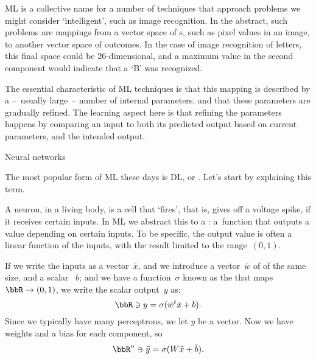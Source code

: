 

\acf{ML} is a collective name for a number of techniques that
approach problems we might consider `intelligent', such as image
recognition. In the abstract, such problems are mappings from a vector
space of s, such as pixel values in an image, to
another vector space of outcomes. In the case of image recognition of
letters, this final space could be 26-dimensional, and a maximum value
in the second component would indicate that a `B' was recognized.

The essential characteristic of \ac{ML} techniques is that
this mapping is described by a --~usually large~-- number of internal
parameters, and that these parameters are gradually refined. The
learning aspect here is that refining the parameters happens by
comparing an input to both its predicted output based on current
parameters, and the intended output.

 {Neural networks}


The most popular form of \ac{ML} these days is \acf{DL}, or
. Let's start by explaining this term.

A neuron, in a living body, is a cell that `fires', that is, gives off
a voltage spike, if it receives certain inputs. In \ac{ML} we abstract
this to a : a~function that outputs a value
depending on certain inputs. To be specific, the output value is often
a linear function of the inputs, with the result
limited to the range~$(0,1)$.

If we write the inputs as a vector~$\bar x$, and we introduce a vector~$\bar w$
of  of the same size, and a scalar ~$b$;
and we have a function~$\sigma$ known as the
 that maps $\bbR\rightarrow(0,1)$, we write the
scalar output~$y$ as:
\[ \bbR\owns y = \sigma( \bar w^t\bar x+b ). \]
Since we typically have many perceptrons, we let $y$ be a vector.
Now we have weights and a bias for each component, so
\[ \bbR^n\owns \bar y = \sigma( W\bar x + \bar b ). \]

